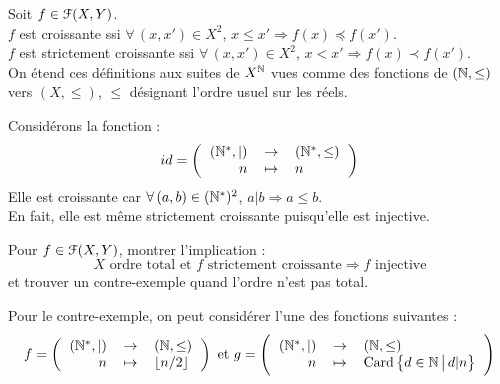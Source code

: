 			\begin{Definitions}
				Soit \(f \in \EuScript{F}(X,Y)\). \\
					 \bdot \(f\) est croissante ssi \(\forall \,(x,x') \in X^2\), \(x \leqslant x' \Longrightarrow f(x) \preccurlyeq f(x')\). \\
					 \bdot \(f\) est strictement croissante ssi \(\forall \,(x,x') \in X^2\), \(x < x' \Longrightarrow f(x) \prec f(x')\). \\[2mm]
				On étend ces définitions aux suites de \(X^{\mathbb{N}}\) vues comme des fonctions de \((\mathbb{N},\leq)\) vers \((X,\leqslant)\), \(\leq\) désignant l'ordre usuel sur les réels.
			\end{Definitions}
			
			\setlength{\tabcolsep}{2.2pt}
			\eqskip{2mm}
			\begin{Exemple} Considérons la fonction :
				\[
					id = \left( \begin{tabular}[h]{rcl}
					\((\bb{N}^*,|)\) & \(\rightarrow\) & \((\bb{N}^*,\leq)\) \\
					\(n\) & \(\mapsto\) & \(n\)
				\end{tabular} \right)
				\]
				Elle est croissante car \(\forall \,(a,b) \in (\mathbb{N}^*)^2\), \(a|b \Longrightarrow a \leq b\). \\
				En fait, elle est même strictement croissante puisqu'elle est injective.
			 \end{Exemple}
			 \eqskip{1mm}
			\begin{Exercice}
				Pour \(f \in \EuScript{F}(X,Y)\), montrer l'implication :
					\[X \text{ ordre total et } f \text{ strictement croissante} \Longrightarrow f \text{ injective}\]
				et trouver un contre-exemple quand l'ordre n'est pas total.
			\end{Exercice}
					Pour le contre-exemple, on peut considérer l'une des fonctions suivantes :
						\[f = \left( \begin{tabular}[h]{rcl}
						\((\bb{N}^*,|)\) & \(\rightarrow\) & \((\bb{N},\leq)\) \\
						\(n\) & \(\mapsto\) & \(\lfloor n/2 \rfloor\)
					\end{tabular} \right) \text{ et } g = \left( \begin{tabular}{rcl}
						\((\bb{N}^*,|)\) & \(\rightarrow\) & \((\bb{N},\leq)\) \\
						\(n\) & \(\mapsto\) & \(\card \big\{d \in \bb{N} \,\big|\, d|n\big\}\)
					\end{tabular} \right)\]
			
